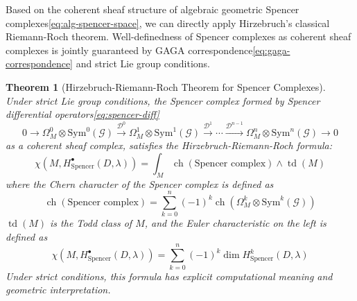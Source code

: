 \documentclass[a4paper,12pt]{extarticle}
\newtheorem{theorem}{Theorem}
\newcommand{\ch}{\operatorname{ch}}
\newcommand{\td}{\operatorname{td}}
\theoremstyle{definition}
\begin{document}
Based on the coherent sheaf structure of algebraic geometric Spencer complexes\eqref{eq:alg-spencer-space}, we can directly apply Hirzebruch's classical Riemann-Roch theorem\cite{hirzebruch1966topological}. Well-definedness of Spencer complexes as coherent sheaf complexes is jointly guaranteed by GAGA correspondence\eqref{eq:gaga-correspondence} and strict Lie group conditions.

\begin{theorem}[Hirzebruch-Riemann-Roch Theorem for Spencer Complexes]
Under strict Lie group conditions, the Spencer complex formed by Spencer differential operators\eqref{eq:spencer-diff}
\begin{equation}\label{eq:spencer-complex}
0 \to \Omega^0_M \otimes \mathrm{Sym}^0(\mathcal{G}) \xrightarrow{\mathcal{D}^0} \Omega^1_M \otimes \mathrm{Sym}^1(\mathcal{G}) \xrightarrow{\mathcal{D}^1} \cdots \xrightarrow{\mathcal{D}^{n-1}} \Omega^n_M \otimes \mathrm{Sym}^n(\mathcal{G}) \to 0
\end{equation}
as a coherent sheaf complex, satisfies the Hirzebruch-Riemann-Roch formula:
\begin{equation}\label{eq:spencer-riemann-roch}
\chi(M, H^{\bullet}_{\mathrm{Spencer}}(D,\lambda)) = \int_M \ch(\text{Spencer complex}) \wedge \td(M)
\end{equation}
where the Chern character of the Spencer complex is defined as
\begin{equation}\label{eq:spencer-chern-char}
\ch(\text{Spencer complex}) = \sum_{k=0}^n (-1)^k \ch(\Omega^k_M \otimes \mathrm{Sym}^k(\mathcal{G}))
\end{equation}
$\td(M)$ is the Todd class of $M$\cite{todd1937invariants}, and the Euler characteristic on the left is defined as
\begin{equation}\label{eq:euler-char-def}
\chi(M, H^{\bullet}_{\mathrm{Spencer}}(D,\lambda)) = \sum_{k=0}^n (-1)^k \dim H^k_{\mathrm{Spencer}}(D,\lambda)
\end{equation}
Under strict conditions, this formula has explicit computational meaning and geometric interpretation.
\end{theorem}
\end{document}
